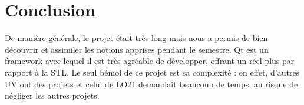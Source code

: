 \chapter{Conclusion}

De manière générale, le projet était très long mais nous a permis de bien découvrir et assimiler les notions apprises pendant le semestre. Qt est un framework avec lequel il est très agréable de développer, offrant un réel plus par rapport à la STL. Le seul bémol de ce projet est sa complexité : en effet, d'autres UV ont des projets et celui de LO21 demandait beaucoup de temps, au risque de négliger les autres projets.